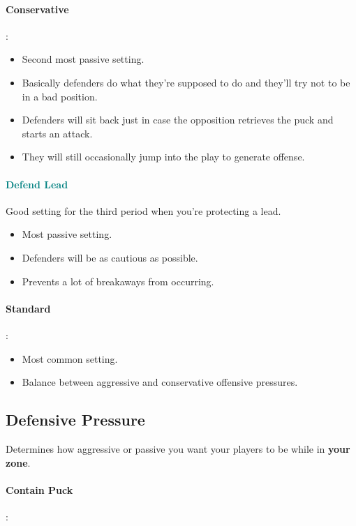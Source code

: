 \documentclass[10pt, french]{article}
\begin{document}
\begin{multicols*}{2}
\paragraph{Conservative}: 

\begin{itemize}[leftmargin = *]
	\item	Second most passive setting.
	\item	Basically defenders do what they're supposed to do and they'll try not to be in a bad position.
	\item	Defenders will sit back just in case the opposition retrieves the puck and starts an attack.
	\item	They will still occasionally jump into the play to generate offense.
\end{itemize}

\paragraph{\textcolor{teal}{Defend Lead}} Good setting for the third period when you're protecting a lead. 

\begin{itemize}[leftmargin = *]
	\item	Most passive setting.
	\item	Defenders will be as cautious as possible.
	\item	Prevents a lot of breakaways from occurring.
\end{itemize}

\paragraph{Standard}: 

\begin{itemize}[leftmargin = *]
	\item	Most common setting.
	\item	Balance between aggressive and conservative offensive pressures.
\end{itemize}

\subsection*{Defensive Pressure}
Determines how aggressive or passive you want your players to be while in \textbf{your zone}.

\paragraph{Contain Puck}: 


\end{multicols*}
\end{document}
